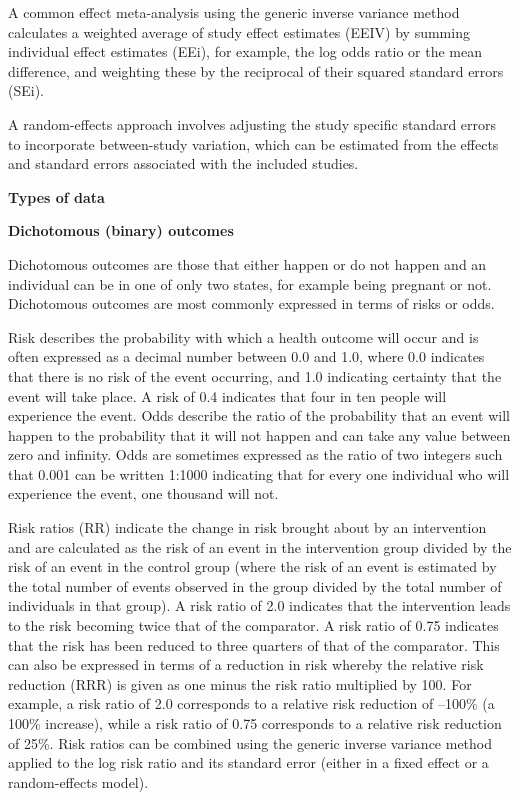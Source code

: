 \documentclass[
  10pt,
  a4paper,
  DIV=11,
  numbers=noendperiod]{scrreprt}
\begin{document}
A common effect meta-analysis using the generic inverse variance method
calculates a weighted average of study effect estimates (EEIV) by
summing individual effect estimates (EEi), for example, the log odds
ratio or the mean difference, and weighting these by the reciprocal of
their squared standard errors (SEi).

A random-effects approach involves adjusting the study specific standard
errors to incorporate between-study variation, which can be estimated
from the effects and standard errors associated with the included
studies.

\textbf{Types of data}

\textbf{Dichotomous (binary) outcomes}

Dichotomous outcomes are those that either happen or do not happen and
an individual can be in one of only two states, for example being
pregnant or not. Dichotomous outcomes are most commonly expressed in
terms of risks or odds.

Risk describes the probability with which a health outcome will occur
and is often expressed as a decimal number between 0.0 and 1.0, where
0.0 indicates that there is no risk of the event occurring, and 1.0
indicating certainty that the event will take place. A risk of 0.4
indicates that four in ten people will experience the event. Odds
describe the ratio of the probability that an event will happen to the
probability that it will not happen and can take any value between zero
and infinity. Odds are sometimes expressed as the ratio of two integers
such that 0.001 can be written 1:1000 indicating that for every one
individual who will experience the event, one thousand will not.

Risk ratios (RR) indicate the change in risk brought about by an
intervention and are calculated as the risk of an event in the
intervention group divided by the risk of an event in the control group
(where the risk of an event is estimated by the total number of events
observed in the group divided by the total number of individuals in that
group). A risk ratio of 2.0 indicates that the intervention leads to the
risk becoming twice that of the comparator. A risk ratio of 0.75
indicates that the risk has been reduced to three quarters of that of
the comparator. This can also be expressed in terms of a reduction in
risk whereby the relative risk reduction (RRR) is given as one minus the
risk ratio multiplied by 100. For example, a risk ratio of 2.0
corresponds to a relative risk reduction of --100\% (a 100\% increase),
while a risk ratio of 0.75 corresponds to a relative risk reduction of
25\%. Risk ratios can be combined using the generic inverse variance
method applied to the log risk ratio and its standard error (either in a
fixed effect or a random-effects model).
\end{document}
